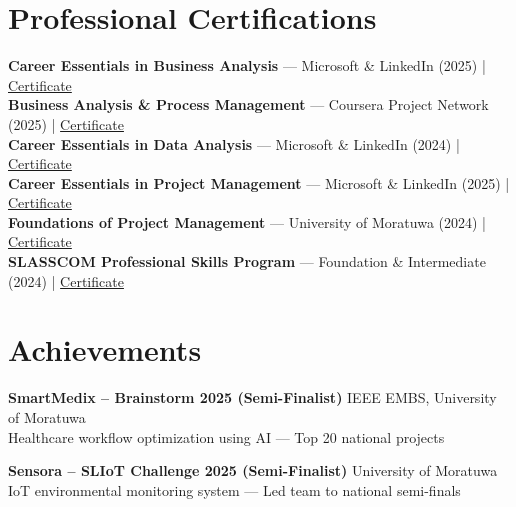 \documentclass[letterpaper,10pt]{article}
\begin{document}
\section{Professional Certifications}
\vspace{-1pt}

\textbf{Career Essentials in Business Analysis} — Microsoft \& LinkedIn (2025) | \href{https://www.linkedin.com/posts/vindya-kodithuwakku-bb6187202_businessanalysis-careeressentials-microsoft-activity-7371193871919398914-PKak}{Certificate}\\
\textbf{Business Analysis \& Process Management} — Coursera Project Network (2025) | \href{https://coursera.org/verify/D5WHDN27811C}{Certificate}\\
\textbf{Career Essentials in Data Analysis} — Microsoft \& LinkedIn (2024) | \href{https://www.linkedin.com/posts/vindya-kodithuwakku-bb6187202_dataanalysis-careeressentials-microsoft-activity-7379124237950750720-kKmD}{Certificate}\\
\textbf{Career Essentials in Project Management} — Microsoft \& LinkedIn (2025) | \href{https://www.linkedin.com/posts/vindya-kodithuwakku-bb6187202_projectmanagement-careeressentials-microsoft-activity-7374470702059438080-zbfj}{Certificate}\\
\textbf{Foundations of Project Management} — University of Moratuwa (2024) | \href{https://open.uom.lk/lms/mod/customcert/verify_certificate.php?code=ATuxOYBBAE&qrcode=1}{Certificate}\\
\textbf{SLASSCOM Professional Skills Program} — Foundation \& Intermediate (2024) | \href{https://www.linkedin.com/posts/vindya-kodithuwakku-bb6187202_slasscom-professionalskillsprogram-careerdevelopment-activity-7379038487246860288-PRA0}{Certificate}

\section{Achievements}
\vspace{-1pt}

\noindent\textbf{SmartMedix – Brainstorm 2025 (Semi-Finalist)} \hfill IEEE EMBS, University of Moratuwa\\
\noindent Healthcare workflow optimization using AI — Top 20 national projects

\vspace{2pt}
\noindent\textbf{Sensora – SLIoT Challenge 2025 (Semi-Finalist)} \hfill University of Moratuwa\\
\noindent IoT environmental monitoring system — Led team to national semi-finals
\end{document}
